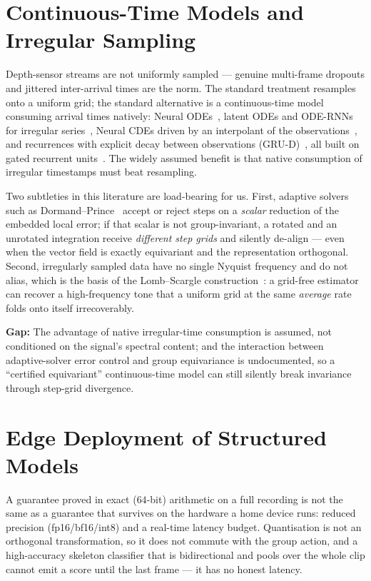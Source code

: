 \documentclass[11pt]{article}
\newcommand{\gap}[1]{\textbf{\textcolor{red!60!black}{Gap:} } #1}
\begin{document}
\section{Continuous-Time Models and Irregular Sampling}
\label{sec:cde}

Depth-sensor streams are not uniformly sampled --- genuine multi-frame dropouts and
jittered inter-arrival times are the norm. The standard treatment resamples onto a
uniform grid; the standard alternative is a continuous-time model consuming arrival
times natively: Neural ODEs~\cite{chen2018neuralode}, latent ODEs and ODE-RNNs for
irregular series~\cite{rubanova2019odernn}, Neural CDEs driven by an interpolant of
the observations~\cite{kidger2020neuralcde}, and recurrences with explicit decay
between observations (GRU-D)~\cite{che2018grud}, all built on gated recurrent
units~\cite{cho2014gru}. The widely assumed benefit is that native consumption of
irregular timestamps must beat resampling.

Two subtleties in this literature are load-bearing for us. First, adaptive
solvers such as Dormand--Prince~\cite{dormand1980prince} accept or reject steps on a
\emph{scalar} reduction of the embedded local error; if that scalar is not
group-invariant, a rotated and an unrotated integration receive \emph{different
step grids} and silently de-align --- even when the vector field is exactly
equivariant and the representation orthogonal. Second, irregularly sampled data have
no single Nyquist frequency and do not alias, which is the basis of the
Lomb--Scargle construction~\cite{vanderplas2018lombscargle}: a grid-free estimator
can recover a high-frequency tone that a uniform grid at the same \emph{average}
rate folds onto itself irrecoverably.

\gap{The advantage of native irregular-time consumption is assumed, not conditioned
on the signal's spectral content; and the interaction between adaptive-solver error
control and group equivariance is undocumented, so a ``certified equivariant''
continuous-time model can still silently break invariance through step-grid
divergence.}

\section{Edge Deployment of Structured Models}
\label{sec:edge}

A guarantee proved in exact ($64$-bit) arithmetic on a full recording is not the
same as a guarantee that survives on the hardware a home device runs: reduced
precision (fp16/bf16/int8) and a real-time latency budget. Quantisation is not an
orthogonal transformation, so it does not commute with the group action, and a
high-accuracy skeleton classifier that is bidirectional and pools over the whole
clip cannot emit a score until the last frame --- it has no honest latency.
\end{document}
